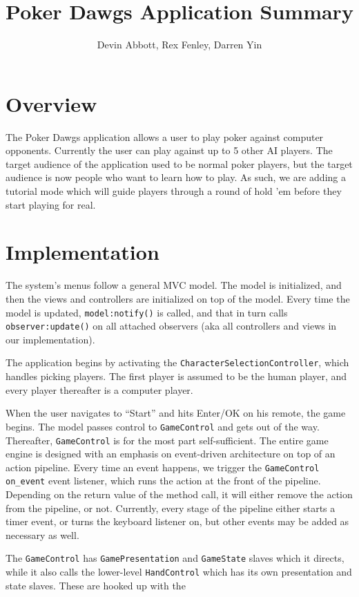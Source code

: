 \documentclass[10pt]{article}
\title{Poker Dawgs Application Summary}
\author{Devin Abbott, Rex Fenley, Darren Yin}
\begin{document}
\maketitle
\section*{Overview}
The Poker Dawgs application allows a user to play poker against
computer opponents. Currently the user can play against up to 5 other
AI players. The target audience of the application used to be normal
poker players, but the target audience is now people who want to learn
how to play. As such, we are adding a tutorial mode which will guide
players through a round of hold 'em before they start playing for
real.

\section*{Implementation}
The system's menus follow a general MVC model. The model is
initialized, and then the views and controllers are initialized on top
of the model. Every time the model is updated, \verb^model:notify()^ is
called, and that in turn calls \verb^observer:update()^ on all attached
observers (aka all controllers and views in our implementation).

The application begins by activating the \verb^CharacterSelectionController^,
which handles picking players. The first player is assumed to be the
human player, and every player thereafter is a computer player.

When the user navigates to ``Start'' and hits Enter/OK on his remote,
the game begins. The model passes control to \verb^GameControl^ and gets out
of the way. Thereafter, \verb^GameControl^ is for the most part
self-sufficient. The entire game engine is designed with an emphasis
on event-driven architecture on top of an action pipeline. Every time
an event happens, we trigger the \verb^GameControl^ \verb^on_event^ event listener,
which runs the action at the front of the pipeline. Depending on the
return value of the method call, it will either remove the action from
the pipeline, or not. Currently, every stage of the pipeline either
starts a timer event, or turns the keyboard listener on, but other
events may be added as necessary as well.

The \verb^GameControl^ has \verb^GamePresentation^ and \verb^GameState^ slaves which it
directs, while it also calls the lower-level \verb^HandControl^ which has its
own presentation and state slaves. These are hooked up with the 
\end{document}

